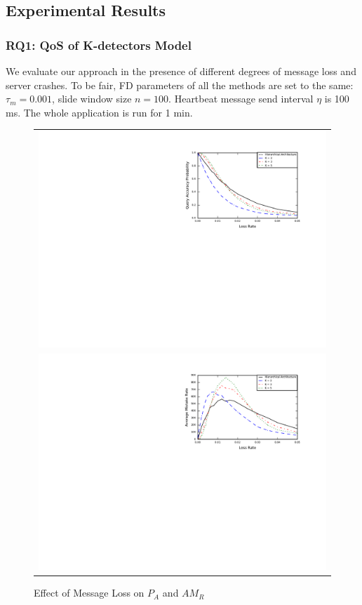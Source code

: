 \documentclass{sig-alternate-05-2015}
\begin{document}
\subsection{Experimental Results}

\subsubsection*{RQ1: QoS of K-detectors Model}
\quad We evaluate our approach in the presence of different degrees of message loss and server crashes. To be fair, FD parameters of all the methods are set to the same: $\tau_m=0.001$, slide window size $n=100$. Heartbeat message send interval $\eta$ is 100 ms. The whole application is run for 1 min.

\begin{figure}
  \centering
  \begin{tabular}{c}
  \includegraphics[scale=0.7]{r1} \\
  \includegraphics[scale=0.7]{r2}
  \end{tabular}
  \caption{Effect of Message Loss on $P_A$ and $AM_R$}
\end{figure}
\end{document}
